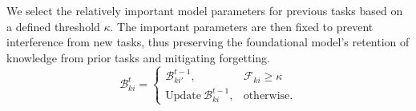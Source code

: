 We select the relatively important model parameters for previous tasks based on a defined threshold $\kappa$. 
The important parameters are then fixed to prevent interference from new tasks, thus preserving the foundational model’s retention of knowledge from prior tasks and mitigating forgetting. 
\begin{equation} \label{eq: local_update}
    \mathcal{B}_{ki}^t=\left\{\begin{array}{ll}
\mathcal{B}_{ki'}^{t-1}, & \mathcal{F}_{ki} \ge \kappa \\
\text{Update}~\mathcal{B}_{ki}^{t-1}, & \text {otherwise}.
\end{array}\right.
\end{equation}
















































